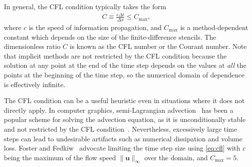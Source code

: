 In general, the CFL condition typically takes the form
\begin{align}
  \label{eq:cfl}
  C \equiv \frac{c\Delta t}{\Delta x} \le C_{\max},
\end{align}
where $c$ is the speed of information propagation, and $C_{\max}$ is a method-dependent constant which depends on the size of the finite-difference stencils.
The dimensionless ratio $C$ is known as the CFL number or the Courant number.
Note that implicit methods are not restricted by the CFL condition because the solution at any point at the end of the time step depends on the values at \emph{all} the points at the beginning of the time step, so the numerical domain of dependence is effectively infinite.

The CFL condition can be a useful heuristic even in situations where it does not directly apply.
In computer graphics, semi-Lagrangian advection~\cite{Stam1999} has been a popular scheme for solving the advection equation, as it is unconditionally stable and not restricted by the CFL condition~\cite{Bridson2008}.
Nevertheless, excessively large time steps can lead to undesirable artifacts such as numerical dissipation and volume loss.
Foster and Fedkiw~\cite{Foster2001} advocate limiting the time step size using \eqref{eq:cfl} with $c$ being the maximum of the flow speed $\|\mathbf u\|_\infty$ over the domain, and $C_{\max} = 5$.

